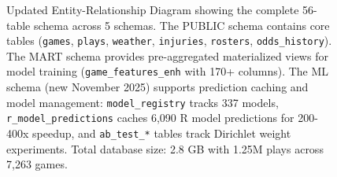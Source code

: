 \begin{figure}[htbp]
\begin{tikzpicture}
\end{tikzpicture}
\caption[Updated Database ERD with ML Schema]{Updated Entity-Relationship Diagram showing the complete 56-table schema across 5 schemas. The PUBLIC schema contains core tables (\texttt{games}, \texttt{plays}, \texttt{weather}, \texttt{injuries}, \texttt{rosters}, \texttt{odds\_history}). The MART schema provides pre-aggregated materialized views for model training (\texttt{game\_features\_enh} with 170+ columns). The ML schema (new November 2025) supports prediction caching and model management: \texttt{model\_registry} tracks 337 models, \texttt{r\_model\_predictions} caches 6,090 R model predictions for 200-400x speedup, and \texttt{ab\_test\_*} tables track Dirichlet weight experiments. Total database size: 2.8 GB with 1.25M plays across 7,263 games.}
\label{fig:database-erd-v2}
\end{figure}
